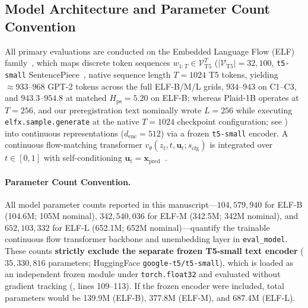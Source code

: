 \documentclass[11pt,a4paper]{article}
\begin{document}
\subsection{Model Architecture and Parameter Count Convention}
All primary evaluations are conducted on the Embedded Language Flow (ELF) family~\citep{hu2026elf}, which maps discrete token sequences $w_{1:T} \in \mathcal{V}_{\mathrm{T5}}^T$ ($|\mathcal{V}_{\mathrm{T5}}| = 32{,}100$, \texttt{t5-small} SentencePiece~\citep{raffel2020exploring}, native sequence length $T=1024$ T5 tokens, yielding $\approx 933\text{--}968$ GPT-2 tokens across the full ELF-B/M/L grids, $934\text{--}943$ on C1--C3, and $943.3\text{--}954.8$ at matched $H_{\mathrm{ps}}=5.20$ on ELF-B; whereas Plaid-1B operates at $T=256$, and our preregistration text nominally wrote $L=256$ while executing \texttt{elfx.sample.generate} at the native $T=1024$ checkpoint configuration; see ) into continuous representations ($d_{\mathrm{enc}}=512$) via a frozen \texttt{t5-small} encoder. A continuous flow-matching transformer $v_\theta(z_t, t, \mathbf{u}_t; s_{\mathrm{cfg}})$ is integrated over $t \in [0,1]$ with self-conditioning $\mathbf{u}_t = \mathbf{x}_{\mathrm{pred}}$~\citep{chen2023analog,lipman2023flow}.

\paragraph{Parameter Count Convention.}
All model parameter counts reported in this manuscript---$104{,}579{,}940$ for ELF-B (104.6M; 105M nominal), $342{,}540{,}036$ for ELF-M (342.5M; 342M nominal), and $652{,}103{,}332$ for ELF-L (652.1M; 652M nominal)---quantify the trainable continuous flow transformer backbone and unembedding layer in \texttt{eval\_model}. These counts \textbf{strictly exclude the separate frozen T5-small text encoder} ($35{,}330{,}816$ parameters; HuggingFace \texttt{google-t5/t5-small}), which is loaded as an independent frozen module under \texttt{torch.float32} and evaluated without gradient tracking (, lines 109--113). If the frozen encoder were included, total parameters would be 139.9M (ELF-B), 377.8M (ELF-M), and 687.4M (ELF-L).
\end{document}
